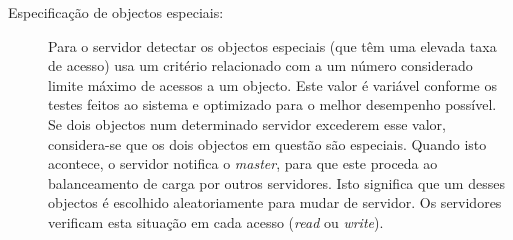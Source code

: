 \begin{description}
\item[Especificação de objectos especiais:]
Para o servidor detectar os objectos especiais (que têm uma elevada taxa de acesso) usa um critério relacionado com a um número considerado limite máximo de acessos a um objecto. Este valor é variável conforme os testes feitos ao sistema e optimizado para o melhor desempenho possível. Se dois objectos num determinado servidor excederem esse valor, considera-se que os dois objectos em questão são especiais. Quando isto acontece, o servidor notifica o \textit{master}, para que este proceda ao balanceamento de carga por outros servidores. Isto significa que um desses objectos é escolhido aleatoriamente para mudar de servidor. Os servidores verificam esta situação em cada acesso (\textit{read} ou \textit{write}).

\end{description}